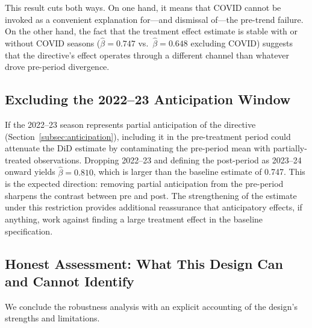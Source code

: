 This result cuts both ways. On one hand, it means that COVID cannot be invoked as a convenient explanation for---and dismissal of---the pre-trend failure. On the other hand, the fact that the treatment effect estimate is stable with or without COVID seasons ($\hat{\beta} = 0.747$ vs.\ $\hat{\beta} = 0.648$ excluding COVID) suggests that the directive's effect operates through a different channel than whatever drove pre-period divergence.


\subsection{Excluding the 2022--23 Anticipation Window}
\label{subsec:excl_anticipation}

If the 2022--23 season represents partial anticipation of the directive (Section~\ref{subsec:anticipation}), including it in the pre-treatment period could attenuate the DiD estimate by contaminating the pre-period mean with partially-treated observations. Dropping 2022--23 and defining the post-period as 2023--24 onward yields $\hat{\beta} = 0.810$, which is larger than the baseline estimate of 0.747. This is the expected direction: removing partial anticipation from the pre-period sharpens the contrast between pre and post. The strengthening of the estimate under this restriction provides additional reassurance that anticipatory effects, if anything, work against finding a large treatment effect in the baseline specification.


\subsection{Honest Assessment: What This Design Can and Cannot Identify}
\label{subsec:honest_assessment}

We conclude the robustness analysis with an explicit accounting of the design's strengths and limitations.


